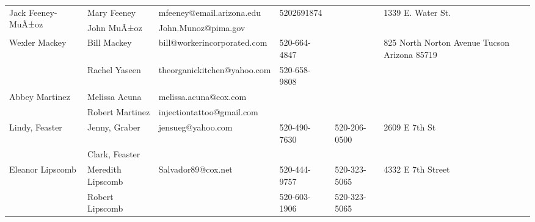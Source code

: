 \documentclass[landscape]{article}\usepackage[]{graphicx}\usepackage[]{color}
\begin{document}
\begin{longtable}{p{70pt}|p{75pt}|p{120pt}|p{60pt}|p{60pt}|p{120pt}|}
\hline
\multirow{2}{70pt}{Jack Feeney-MuÃ±oz} & Mary Feeney & mfeeney@email.arizona.edu & 5202691874 &  & \multirow{2}{100pt}{1339 E. Water St.} \\
 & John MuÃ±oz & John.Munoz@pima.gov &  &  & \\
\hline
\multirow{2}{70pt}{Wexler Mackey} & Bill Mackey & bill@workerincorporated.com & 520-664-4847 &  & \multirow{2}{100pt}{825 North Norton Avenue Tucson Arizona 85719} \\
 & Rachel Yaseen & theorganickitchen@yahoo.com & 520-658-9808 &  & \\
\hline
\multirow{2}{70pt}{Abbey Martinez} & Melissa Acuna & melissa.acuna@cox.com &  &  & \multirow{2}{100pt}{} \\
 & Robert Martinez & injectiontattoo@gmail.com &  &  & \\
\hline
\multirow{2}{70pt}{Lindy, Feaster} & Jenny, Graber & jensueg@yahoo.com & 520-490-7630 & 520-206-0500 & \multirow{2}{100pt}{2609 E 7th St} \\
 & Clark, Feaster &  &  &  & \\
\hline
\multirow{2}{70pt}{Eleanor Lipscomb} & Meredith Lipscomb & Salvador89@cox.net & 520-444-9757 & 520-323-5065 & \multirow{2}{100pt}{4332 E 7th Street} \\
 & Robert Lipscomb &  & 520-603-1906 & 520-323-5065 & \\
\hline
\end{longtable}
\newpage
\end{document}
